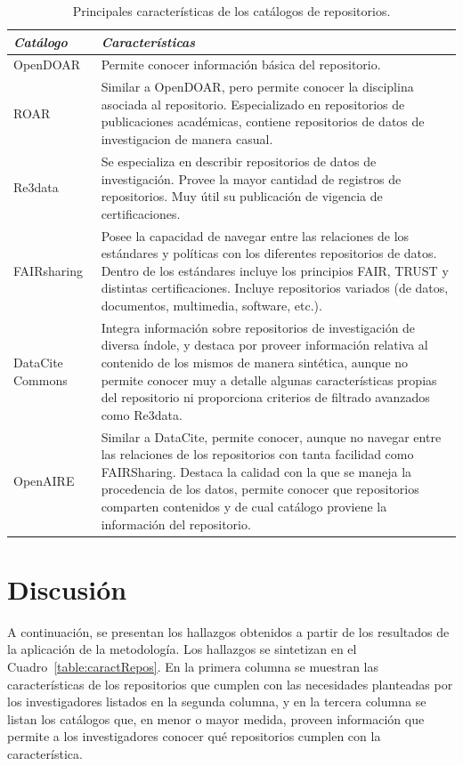 \documentclass[runningheads]{llncs}
\begin{document}
\small
\begin{table}[h]
\centering
    \begin{tabular}{l | p{11cm}}
    \emph{Catálogo} & \emph{Características}\\
    \hline
    OpenDOAR & Permite conocer información básica del repositorio. \\ \hline
    ROAR &  Similar a  OpenDOAR, pero permite conocer la disciplina asociada al repositorio. Especializado en repositorios de publicaciones académicas, contiene repositorios de datos de investigacion de manera casual. \\ \hline
    Re3data & Se especializa en describir repositorios de datos de investigación. Provee la mayor cantidad de registros de repositorios. Muy útil su publicación de vigencia de certificaciones.  \\ \hline
    FAIRsharing & Posee la capacidad de navegar entre las relaciones de los estándares y políticas con los diferentes repositorios de datos. Dentro de los estándares incluye los principios FAIR, TRUST y distintas certificaciones. Incluye repositorios variados (de datos, documentos, multimedia, software, etc.). \\ \hline
    DataCite Commons & Integra información sobre repositorios de investigación de diversa índole, y destaca por proveer información relativa al contenido de los mismos de manera sintética, aunque no permite conocer muy a detalle algunas características propias del repositorio ni proporciona criterios de filtrado avanzados como Re3data. \\ \hline
    OpenAIRE & Similar a DataCite, permite conocer, aunque no navegar entre las relaciones de los repositorios con tanta facilidad como FAIRSharing. Destaca la calidad con la que se maneja la procedencia de los datos, permite conocer que repositorios comparten contenidos y de cual catálogo proviene la información del repositorio.\\ \hline
    \end{tabular}
    \caption{\label{tab:catalog_main_features}Principales características de los catálogos de repositorios.}
\end{table}
\normalsize

\section{Discusión}

A continuación, se presentan los hallazgos obtenidos a partir de los resultados de la aplicación de la metodología. Los hallazgos se sintetizan en el Cuadro~\ref{table:caractRepos}. En la primera columna se muestran las características de los repositorios que cumplen con las necesidades planteadas por los investigadores listados en la segunda columna, y en la tercera columna se listan los catálogos que, en menor o mayor medida, proveen información que permite a los investigadores conocer qué repositorios cumplen con la característica.  
\end{document}
